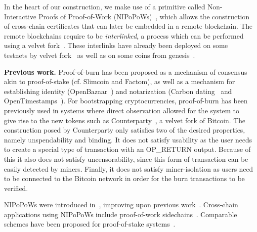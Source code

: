 In the heart of our construction, we make use of a primitive called
Non-Interactive Proofs of Proof-of-Work (NIPoPoWs)~\cite{nipopows}, which allows the
construction of cross-chain certificates that can later be embedded in a remote
blockchain. The remote blockchains require to be \emph{interlinked}, a process
which can be performed using a velvet fork~\cite{velvet}. These interlinks have
already been deployed on some testnets by velvet fork~\cite{gtklocker} as well
as on some coins from genesis~\cite{ergo}.

\noindent
\textbf{Previous work.}
Proof-of-burn has been proposed as a mechanism of consensus akin to
proof-of-stake (cf. Slimcoin and Factom), as well as a mechanism for
establishing identity (OpenBazaar~\cite{zindros2016trust}) and notarization
(Carbon dating~\cite{clark2012commitcoin} and
OpenTimestamps~\cite{todd2016opentimestamps}). For bootstrapping
cryptocurrencies, proof-of-burn has been previously used in systems where direct
observation allowed for the system to give rise to the new tokens such as
Counterparty~\cite{counterparty}, a velvet fork of Bitcoin. The construction posed by Counterparty only satisfies two of the desired properties, namely unspendability and binding. It does not satisfy usability as the user needs to create a special type of transaction with an \textsf{OP\_RETURN} output. Because of this it also does not satisfy uncensorability, since this form of transaction can be easily detected by miners. Finally, it does not satisfy miner-isolation as users need to be connected to the Bitcoin network in order for the burn transactions to be verified.

NIPoPoWs were introduced in~\cite{nipopows}, improving upon previous
work~\cite{popow,highway}. Cross-chain applications using NIPoPoWs include
proof-of-work sidechains~\cite{pow-sidechains}. Comparable schemes have been
proposed for proof-of-stake systems~\cite{pos-sidechains}.

